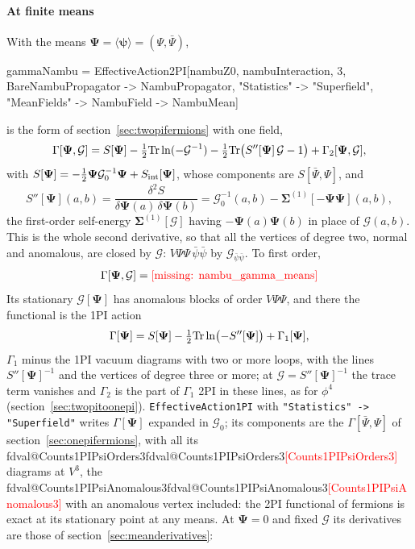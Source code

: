 \documentclass[11pt,a4paper]{article}
\makeatletter
\newcommand{\formula}[1]{\IfFileExists{figures/formula_#1.tex}{}{\text{\textcolor{red}{[missing: \detokenize{#1}]}}}}
\newcommand{\formulasplit}[1]{\IfFileExists{figures/formula_#1_split.tex}{}{\formula{#1}}}
\newcommand{\formulalines}[1]{\IfFileExists{figures/formula_#1_lines.tex}{}{\formulasplit{#1}}}
\newcommand{\pkg}[1]{\texttt{#1}}
\newcommand{\sfield}{\boldsymbol\psi}
\newcommand{\sfieldmean}{\boldsymbol\Psi}
\newcommand{\sfieldSigma}{\boldsymbol\Sigma}
\newcommand{\val}[1]{\ifcsname fdval@#1\endcsname\csname fdval@#1\endcsname\else\textcolor{red}{[#1]}\fi}
\makeatother
\begin{document}
\paragraph{At finite means} With the means $\sfieldmean=\langle\sfield\rangle=(\Psi,\bar\Psi)$,
\begin{code}
gammaNambu = EffectiveAction2PI[nambuZ0, nambuInteraction, 3,
    BareNambuPropagator -> NambuPropagator, "Statistics" -> "Superfield",
    "MeanFields" -> {NambuField -> NambuMean}]
\end{code}
is the form of section~\ref{sec:twopifermions} with one field,
\[
\Gamma[\sfieldmean,\mathcal G]=S[\sfieldmean]-\tfrac12{\rm Tr}\ln(-\mathcal G^{-1})-\tfrac12{\rm Tr}\bigl(S''[\sfieldmean]\,\mathcal G-1\bigr)
+\Gamma_2[\sfieldmean,\mathcal G],
\]
with $S[\sfieldmean]=-\frac12\sfieldmean\mathcal G_0^{-1}\sfieldmean+S_{\rm int}[\sfieldmean]$, whose components are $S[\bar\Psi,\Psi]$, and
\[
S''[\sfieldmean](a,b)=\frac{\delta^2S}{\delta\sfieldmean(a)\,\delta\sfieldmean(b)}=\mathcal G_0^{-1}(a,b)-\sfieldSigma^{(1)}[-\sfieldmean\sfieldmean](a,b),
\]
the first-order self-energy $\sfieldSigma^{(1)}[\mathcal G]$ having $-\sfieldmean(a)\sfieldmean(b)$ in place of $\mathcal G(a,b)$. This is the whole
second derivative, so that
all the vertices of degree two, normal and anomalous, are closed by $\mathcal G$: $V\Psi\Psi\,\bar\psi\bar\psi$ by
$\mathcal G_{\bar\psi\bar\psi}$. To first order,
\begin{gather*}
\Gamma[\sfieldmean,\mathcal G]=\formulalines{nambu_gamma_means}
\end{gather*}
Its stationary $\mathcal G[\sfieldmean]$ has anomalous blocks of order $V\Psi\Psi$, and there the functional is the 1PI action
\[
\Gamma[\sfieldmean]=S[\sfieldmean]-\tfrac12{\rm Tr}\ln\bigl(-S''[\sfieldmean]\bigr)+\Gamma_1[\sfieldmean],
\]
$\Gamma_1$ minus the 1PI vacuum diagrams with two or more loops, with the lines $S''[\sfieldmean]^{-1}$ and the vertices of degree
three or more; at $\mathcal G=S''[\sfieldmean]^{-1}$ the trace term vanishes and $\Gamma_2$ is the part of $\Gamma_1$ 2PI in these lines, as
for $\phi^4$ (section~\ref{sec:twopitoonepi}). \pkg{EffectiveAction1PI} with \pkg{"Statistics" -> "Superfield"} writes $\Gamma[\sfieldmean]$
expanded in $\mathcal G_0$; its components are the $\Gamma[\bar\Psi,\Psi]$ of section~\ref{sec:onepifermions}, with all its
\val{Counts1PIPsiOrders3} diagrams at $V^3$, the \val{Counts1PIPsiAnomalous3} with an anomalous vertex included: the 2PI functional
of fermions is exact at its stationary point at any means. At $\sfieldmean=0$ and fixed $\mathcal G$ its derivatives are those of section~\ref{sec:meanderivatives}:
\end{document}
